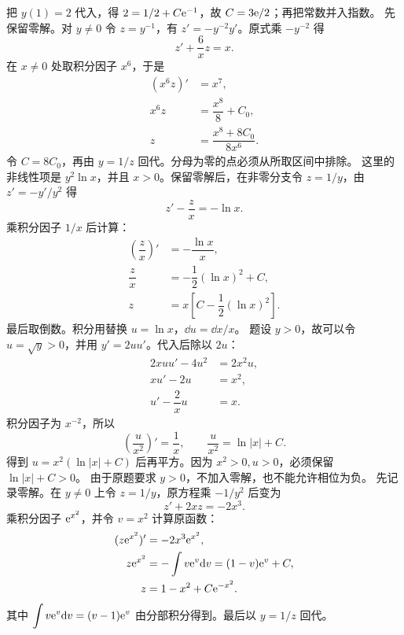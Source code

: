 把 $y(1)=2$ 代入，得 $2=1/2+C\mathrm e^{-1}$，故 $C=3\mathrm e/2$；再把常数并入指数。
先保留零解。对 $y\ne0$ 令 $z=y^{-1}$，有 $z'=-y^{-2}y'$。原式乘 $-y^{-2}$ 得
\[
z'+\dfrac6x z=x.
\]
在 $x\ne0$ 处取积分因子 $x^6$，于是
\[
\begin{aligned}
(x^6z)'&=x^7,\\
x^6z&=\dfrac{x^8}{8}+C_0,\\
z&=\dfrac{x^8+8C_0}{8x^6}.
\end{aligned}
\]
令 $C=8C_0$，再由 $y=1/z$ 回代。分母为零的点必须从所取区间中排除。
这里的非线性项是 $y^2\ln x$，并且 $x>0$。保留零解后，在非零分支令 $z=1/y$，由 $z'=-y'/y^2$ 得
\[
z'-\dfrac zx=-\ln x.
\]
乘积分因子 $1/x$ 后计算：
\[
\begin{aligned}
\left(\dfrac zx\right)'&=-\dfrac{\ln x}{x},\\
\dfrac zx&=-\dfrac12(\ln x)^2+C,\\
z&=x\left[C-\dfrac12(\ln x)^2\right].
\end{aligned}
\]
最后取倒数。积分用替换 $u=\ln x$，$\dd u=\dd x/x$。
题设 $y>0$，故可以令 $u=\sqrt y>0$，并用 $y'=2uu'$。代入后除以 $2u$：
\[
\begin{aligned}
2xuu'-4u^2&=2x^2u,\\
xu'-2u&=x^2,\\
u'-\dfrac2xu&=x.
\end{aligned}
\]
积分因子为 $x^{-2}$，所以
\[
\left(\dfrac u{x^2}\right)'=\dfrac1x,
\qquad \dfrac u{x^2}=\ln|x|+C.
\]
得到 $u=x^2(\ln|x|+C)$ 后再平方。因为 $x^2>0,u>0$，必须保留 $\ln|x|+C>0$。
由于原题要求 $y>0$，不加入零解，也不能允许相位为负。
先记录零解。在 $y\ne0$ 上令 $z=1/y$，原方程乘 $-1/y^2$ 后变为
\[
z'+2xz=-2x^3.
\]
乘积分因子 $\mathrm e^{x^2}$，并令 $v=x^2$ 计算原函数：
\[
\begin{aligned}
(z\mathrm e^{x^2})'&=-2x^3\mathrm e^{x^2},\\
z\mathrm e^{x^2}&=-\int v\mathrm e^v\mathrm d v
=(1-v)\mathrm e^v+C,\\
z&=1-x^2+C\mathrm e^{-x^2}.
\end{aligned}
\]
其中 $\displaystyle \int v\mathrm e^v\mathrm d v=(v-1)\mathrm e^v$ 由分部积分得到。最后以 $y=1/z$ 回代。
